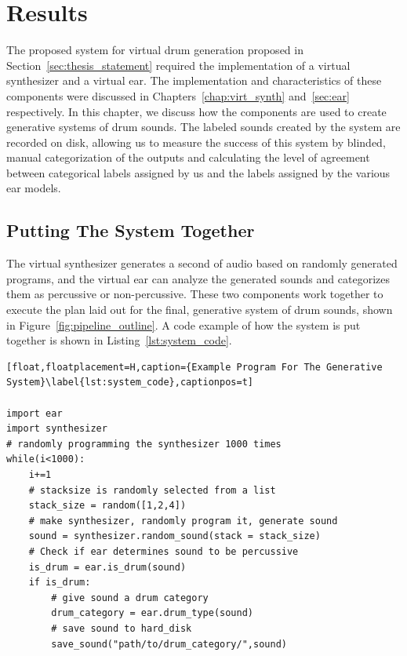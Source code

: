 \documentclass[\main/thesis.tex]{subfiles}
\begin{document}
\chapter{Results}
\label{chap:nov_gen}
The proposed system for virtual drum generation proposed in Section~\ref{sec:thesis_statement} required the implementation of a virtual synthesizer and a virtual ear. The implementation and characteristics of these components were discussed in Chapters~\ref{chap:virt_synth} and~\ref{sec:ear} respectively. In this chapter, we discuss how the components are used to create generative systems of drum sounds. The labeled sounds created by the system are recorded on disk, allowing us to measure the success of this system by blinded, manual categorization of the outputs and calculating the level of agreement between categorical labels assigned by us and the labels assigned by the various ear models. 

\newcommand{\decfirst}{\textit{Decision.1}}
\newcommand{\decsecond}{\textit{Decision.2}}
\section{Putting The System Together}
 The virtual synthesizer generates a second of audio based on randomly generated programs, and the virtual ear can analyze the generated sounds and categorizes them as percussive or non-percussive. These two components work together to execute the plan laid out for the final, generative system of drum sounds, shown in Figure~\ref{fig:pipeline_outline}. A code example of how the system is put together is shown in Listing~\ref{lst:system_code}.

\begin{lstlisting}[float,floatplacement=H,caption={Example Program For The Generative System}\label{lst:system_code},captionpos=t]

import ear
import synthesizer
# randomly programming the synthesizer 1000 times 
while(i<1000):
    i+=1
    # stacksize is randomly selected from a list
    stack_size = random([1,2,4])
    # make synthesizer, randomly program it, generate sound
    sound = synthesizer.random_sound(stack = stack_size)
    # Check if ear determines sound to be percussive
    is_drum = ear.is_drum(sound)
    if is_drum:
        # give sound a drum category 
        drum_category = ear.drum_type(sound) 
        # save sound to hard_disk
        save_sound("path/to/drum_category/",sound) 
\end{lstlisting}
\end{document}
